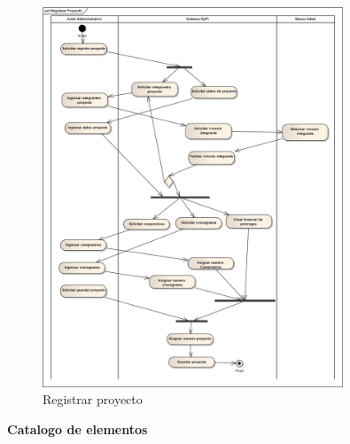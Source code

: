 \documentclass[12pt,oneside,letterpaper]{report}
\begin{document}
\begin{figure}[h!]
  \centering
    \includegraphics[width=0.80\textwidth]{./img/img11.png}
  \caption{Registrar proyecto}
\end{figure}


\textbf{Catalogo de elementos}\\
\end{document}
